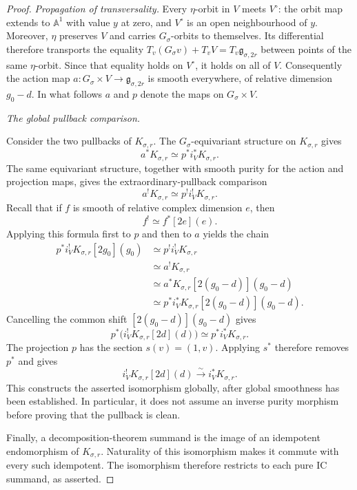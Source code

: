\documentclass[10pt,a4paper]{amsart}
\begin{document}
\begin{proof}
\smallskip
\noindent\emph{Propagation of transversality.}
Every $\eta$-orbit in $V$ meets $V^\circ$: the orbit map extends to
$\mathbb A^1$ with value $y$ at zero, and $V^\circ$ is an open
neighbourhood of $y$.  Moreover, $\eta$ preserves $V$ and carries
$G_\sigma$-orbits to themselves.  Its differential therefore transports
the equality
$T_v(G_\sigma v)+T_vV=T_v\mathfrak g_{\sigma,2r}$
between points of the same $\eta$-orbit.  Since that equality holds on
$V^\circ$, it holds on all of $V$.
Consequently the action map
$a:G_\sigma\times V\to\mathfrak g_{\sigma,2r}$ is smooth everywhere,
of relative dimension $g_0-d$.  In what follows $a$ and $p$ denote
the maps on $G_\sigma\times V$.

\smallskip
\noindent\emph{The global pullback comparison.}

Consider the two pullbacks of $K_{\sigma,r}$.  The
$G_\sigma$-equivariant structure on $K_{\sigma,r}$ gives
\[
 a^*K_{\sigma,r}\simeq p^*i_V^*K_{\sigma,r}.
\]
The same equivariant structure, together with smooth purity for the action
and projection maps, gives the extraordinary-pullback comparison
\[
 a^!K_{\sigma,r}\simeq p^!i_V^!K_{\sigma,r}.
\]
Recall that if $f$ is smooth of relative complex dimension $e$, then
\[
 f^!\simeq f^*[2e](e).
\]
Applying this formula first to $p$ and then to $a$ yields the chain
\[
\begin{aligned}
 p^*i_V^!K_{\sigma,r}[2g_0](g_0)
 &\simeq p^!i_V^!K_{\sigma,r}\\
 &\simeq a^!K_{\sigma,r}\\
 &\simeq a^*K_{\sigma,r}[2(g_0-d)](g_0-d)\\
 &\simeq p^*i_V^*K_{\sigma,r}
       [2(g_0-d)](g_0-d).
\end{aligned}
\]
Cancelling the common shift $[2(g_0-d)](g_0-d)$ gives
\[
 p^*\bigl(i_V^!K_{\sigma,r}[2d](d)\bigr)
 \simeq p^*i_V^*K_{\sigma,r}.
\]
The projection $p$ has the section $s(v)=(1,v)$.  Applying $s^*$ therefore
removes $p^*$ and gives
\[
 i_V^!K_{\sigma,r}[2d](d)
 \xrightarrow{\sim}i_V^*K_{\sigma,r}.
\]
This constructs the asserted isomorphism globally, after global
smoothness has been established.  In particular, it does not assume
an inverse purity morphism before proving that the pullback is clean.

Finally, a decomposition-theorem summand is the image of an idempotent
endomorphism of $K_{\sigma,r}$.  Naturality of this isomorphism makes it commute with
every such idempotent.  The isomorphism therefore restricts to each pure IC
summand, as asserted.
\end{proof}
\end{document}
